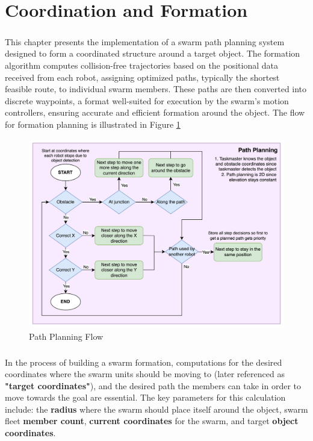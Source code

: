 \chapter{Coordination and Formation}

\paragraph*{}
This chapter presents the implementation of a swarm path planning system designed to form a coordinated structure around a target object. The formation algorithm computes collision-free trajectories based on the positional data received from each robot, assigning optimized paths, typically the shortest feasible route, to individual swarm members. These paths are then converted into discrete waypoints, a format well-suited for execution by the swarm’s motion controllers, ensuring accurate and efficient formation around the object. The flow for formation planning is illustrated in Figure \ref{}

\begin{figure} [H]
    \centering
    \includegraphics[width=1\linewidth]{assets/images/formation/path-planning-flow.png}
    \caption{Path Planning Flow}
    \label{fig:path-planning-flow}
\end{figure}

\paragraph*{}
In the process of building a swarm formation, computations for the desired coordinates where the swarm units should be moving to (later referenced as \textbf{"target coordinates"}), and the desired path the members can take in order to move towards the goal are essential. The key parameters for this calculation include: the \textbf{radius} where the swarm should place itself around the object, swarm fleet \textbf{member count}, \textbf{current coordinates} for the swarm, and target \textbf{object coordinates}.

